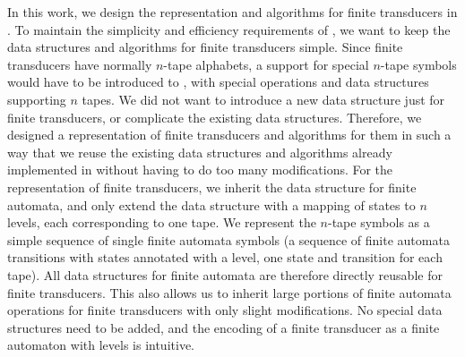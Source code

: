 In this work, we design the representation and algorithms for finite transducers in \mata.
To maintain the simplicity and efficiency requirements of \mata, we want to keep the data structures and algorithms for finite transducers simple.
Since finite transducers have normally $n$-tape alphabets, a support for special $n$-tape symbols would have to be introduced to \mata, with special operations and data structures supporting $n$ tapes.
We did not want to introduce a new data structure just for finite transducers, or complicate the existing data structures.
Therefore, we designed a representation of finite transducers and algorithms for them in such a way that we reuse the existing data structures and algorithms already implemented in \mata without having to do too many modifications.
For the representation of finite transducers, we inherit the data structure for finite automata, and only extend the data structure with a mapping of states to $n$ levels, each corresponding to one tape.
We represent the $n$-tape symbols as a simple sequence of single finite automata symbols (a sequence of finite automata transitions with states annotated with a level, one state and transition for each tape).
All data structures for finite automata are therefore directly reusable for finite transducers.
This also allows us to inherit large portions of finite automata operations for finite transducers with only slight modifications.
No special data structures need to be added, and the encoding of a finite transducer as a finite automaton with levels is intuitive.

